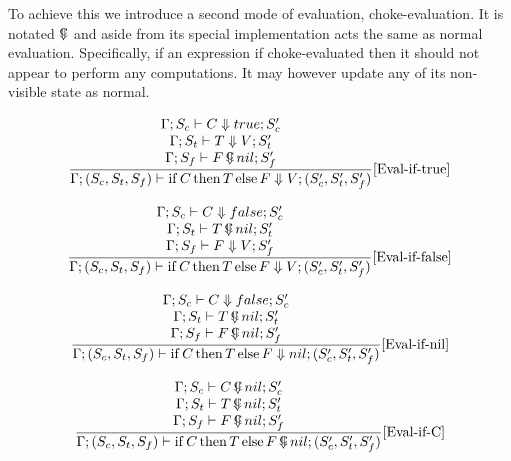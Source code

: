 \documentclass{scrartcl}
\DeclareMathOperator{\ifop}{if}
\DeclareMathOperator{\thenop}{then}
\DeclareMathOperator{\elseop}{else}
\DeclareMathOperator{\ceval}{\overset{C}{\smash{\Downarrow}}}
\begin{document}
    To achieve this we introduce a second mode of evaluation, choke-evaluation. It is notated $\ceval$ and aside from its special implementation acts the same as normal evaluation. Specifically, if an expression if choke-evaluated then it should not appear to perform any computations. It may however update any of its non-visible state as normal.
    
    \begin{align*}
    \frac{
        \begin{matrix}
        \Gamma; S_c \vdash C \Downarrow true; S_c' \\
        \Gamma; S_t \vdash T \Downarrow V; S_t' \\
        \Gamma; S_f \vdash F \ceval nil; S_f'
        \end{matrix}
    }{
        \Gamma; (S_c, S_t, S_f) \vdash \ifop C \thenop T \elseop F \Downarrow V; (S_c', S_t', S_f')
    }[\text{Eval-if-true}]
    \end{align*}
    
    \begin{align*}
    \frac{
        \begin{matrix}
        \Gamma; S_c \vdash C \Downarrow false; S_c' \\
        \Gamma; S_t \vdash T \ceval nil; S_t' \\
        \Gamma; S_f \vdash F \Downarrow V; S_f'
        \end{matrix}
    }{
        \Gamma; (S_c, S_t, S_f) \vdash \ifop C \thenop T \elseop F \Downarrow V; (S_c', S_t', S_f')
    }[\text{Eval-if-false}]
    \end{align*}
    
    \begin{align*}
    \frac{
        \begin{matrix}
        \Gamma; S_c \vdash C \Downarrow false; S_c' \\
        \Gamma; S_t \vdash T \ceval nil; S_t' \\
        \Gamma; S_f \vdash F \ceval nil; S_f'
        \end{matrix}
    }{
        \Gamma; (S_c, S_t, S_f) \vdash \ifop C \thenop T \elseop F \Downarrow nil; (S_c', S_t', S_f')
    }[\text{Eval-if-nil}]
    \end{align*}
    
    \begin{align*}
    \frac{
        \begin{matrix}
        \Gamma; S_c \vdash C \ceval nil; S_c' \\
        \Gamma; S_t \vdash T \ceval nil; S_t' \\
        \Gamma; S_f \vdash F \ceval nil; S_f'
        \end{matrix}
    }{
        \Gamma; (S_c, S_t, S_f) \vdash \ifop C \thenop T \elseop F \ceval nil; (S_c', S_t', S_f')
    }[\text{Eval-if-C}]
    \end{align*}
    
\end{document}
